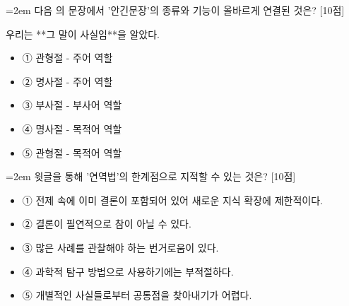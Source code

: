 \documentclass[11pt,a4paper]{article}
\newcommand{\qnum}[1]{%
  \tikz[baseline=(num.base)]{%
    \node[circle, fill=numCircle, text=white, inner sep=0pt,
          minimum size=18pt, font=\small\bfseries] (num) {#1};%
  }%
}
\newcommand{\pts}[1]{%
  \hfill\textcolor{ptsBadge}{[#1점]}%
}
\begin{document}
\vspace{4mm}
\begin{minipage}{\columnwidth}
{\hangindent=2em
\qnum{45}\enspace 다음 의 문장에서 '안긴문장'의 종류와 기능이 올바르게 연결된 것은? \pts{10}
\par}

\vspace{3mm}
\begin{tcolorbox}[bogi]
우리는 **그 말이 사실임**을 알았다.
\end{tcolorbox}
\vspace{3mm}
\begin{itemize}[leftmargin=2.5em, labelsep=0.3em, label={}, itemsep=4pt, parsep=1pt, topsep=0pt]
  \item ① 관형절 - 주어 역할
  \item ② 명사절 - 주어 역할
  \item ③ 부사절 - 부사어 역할
  \item ④ 명사절 - 목적어 역할
  \item ⑤ 관형절 - 목적어 역할
\end{itemize}
\end{minipage}
\vspace{4mm}

\vspace{4mm}
\begin{minipage}{\columnwidth}
{\hangindent=2em
\qnum{46}\enspace 윗글을 통해 '연역법'의 한계점으로 지적할 수 있는 것은? \pts{10}
\par}

\vspace{3mm}
\begin{itemize}[leftmargin=2.5em, labelsep=0.3em, label={}, itemsep=4pt, parsep=1pt, topsep=0pt]
  \item ① 전제 속에 이미 결론이 포함되어 있어 새로운 지식 확장에 제한적이다.
  \item ② 결론이 필연적으로 참이 아닐 수 있다.
  \item ③ 많은 사례를 관찰해야 하는 번거로움이 있다.
  \item ④ 과학적 탐구 방법으로 사용하기에는 부적절하다.
  \item ⑤ 개별적인 사실들로부터 공통점을 찾아내기가 어렵다.
\end{itemize}
\end{minipage}
\vspace{4mm}
\end{document}
